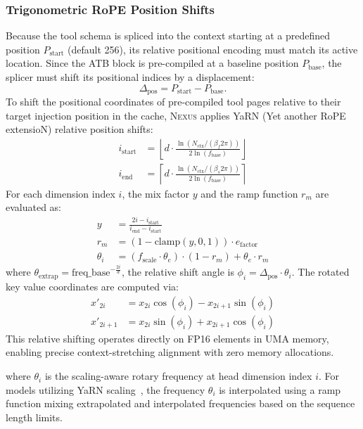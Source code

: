 \documentclass[conference,10pt]{IEEEtran}
\newcommand{\Nexus}{\textsc{Nexus}\xspace}
\begin{document}
\subsubsection{Trigonometric RoPE Position Shifts}
Because the tool schema is spliced into the context starting at a predefined position $P_{\text{start}}$ (default 256), its relative positional encoding must match its active location. Since the ATB block is pre-compiled at a baseline position $P_{\text{base}}$, the splicer must shift its positional indices by a displacement:
\begin{equation}
\Delta_{\text{pos}} = P_{\text{start}} - P_{\text{base}}.
\end{equation}
To shift the positional coordinates of pre-compiled tool pages relative to their target injection position in the cache, \Nexus applies YaRN (Yet another RoPE extensioN) relative position shifts:
\begin{align}
i_{\text{start}} &= \left\lfloor d \cdot \frac{\ln(N_{\text{ctx}} / (\beta_f 2\pi))}{2 \ln(f_{\text{base}})} \right\rfloor \\
i_{\text{end}} &= \left\lceil d \cdot \frac{\ln(N_{\text{ctx}} / (\beta_s 2\pi))}{2 \ln(f_{\text{base}})} \right\rceil
\end{align}
For each dimension index $i$, the mix factor $y$ and the ramp function $r_m$ are evaluated as:
\begin{align}
y &= \frac{2i - i_{\text{start}}}{i_{\text{end}} - i_{\text{start}}} \\
r_m &= (1 - \text{clamp}(y, 0, 1)) \cdot e_{\text{factor}} \\
\theta_i &= (f_{\text{scale}} \cdot \theta_e) \cdot (1 - r_m) + \theta_e \cdot r_m
\end{align}
where $\theta_{\text{extrap}} = \text{freq\_base}^{-\frac{2i}{d}}$, the relative shift angle is $\phi_i = \Delta_{\text{pos}} \cdot \theta_i$. The rotated key value coordinates are computed via:
\begin{align}
x'_{2i} &= x_{2i}\cos(\phi_i) - x_{2i+1}\sin(\phi_i) \\
x'_{2i+1} &= x_{2i}\sin(\phi_i) + x_{2i+1}\cos(\phi_i)
\end{align}
This relative shifting operates directly on FP16 elements in UMA memory, enabling precise context-stretching alignment with zero memory allocations.

where $\theta_i$ is the scaling-aware rotary frequency at head dimension index $i$. For models utilizing YaRN scaling~\cite{peng2023yarn}, the frequency $\theta_i$ is interpolated using a ramp function mixing extrapolated and interpolated frequencies based on the sequence length limits.
\end{document}
